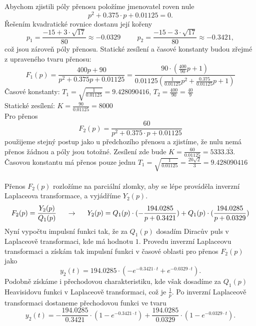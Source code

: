 \documentclass{article}
\begin{document}
			Abychom zjistili póly přenosu položíme jmenovatel roven nule
			\[p^2 + 0.375\cdot p + 0.01125=0.\]
			Řešením kvadratické rovnice dostanu její kořeny
			\[p_{1}=\frac{-15+3\cdot\sqrt{17}}{80}\approx -0.0329 \hspace{1cm} p_{2}=\frac{-15-3\cdot\sqrt{17}}{80}\approx -0.3421,\] což jsou zároveň póly přenosu.
			Statické zesílení a časové konstanty budou zřejmé z upraveného tvaru přenosu:
			\[F_{1}(p)=\frac{400p+90}{p^{2}+0.375p+0.01125}=\frac{90\cdot(\frac{400}{90}p+1)}{0.01125(\frac{1}{0.01125}p^{2}+\frac{0.375}{0.01125}p+1)}\]
			Časové konstanty:  \(T_{1}=\sqrt{\frac{1}{0.01125}}=9.428090416\), \(T_{2}=\frac{400}{90}=\frac{40}{9}\)\\
			Statické zesílení: \(K=\frac{90}{0.01125}=8000\)\\
			Pro přenos \[F_{2}(p)=\frac{60}{p^2 + 0.375\cdot p + 0.01125}\] použijeme stejný postup jako u předchozího přenosu a zjistíme, že nulu nemá přenos žádnou a póly jsou totožné. Zesílení zde bude \(K=\frac{60}{0.01125}=5333.\overline{33}\). Časovou konstantu má přenos pouze jednu \(T_{1}=\sqrt{\frac{1}{0.01125}}=\frac{20\sqrt{2}}{3}=9.428090416\)\\\\
			Přenos \(F_{2}(p)\) rozložíme na parciální zlomky, aby se lépe prováděla inverzní Laplaceova transformace, a vyjádříme \(Y_{2}(p)\).
			\[F_{2}(p)=\frac{Y_{2}(p)}{Q_{1}(p)}\hspace{5mm} \rightarrow \hspace{5mm} Y_{2}(p)=Q_{1}(p)\cdot(-\frac{194.0285}{p+0.3421})+Q_{1}(p)\cdot(\frac{194.0285}{p+0.0329})\]
			Nyní vypočtu impulsní funkci tak, že za \(Q_{1}(p)\) dosadím Diracův puls v Laplaceově transformaci, kde má hodnotu \(1\). Provedu inverzní Laplaceovu transformaci a získám tak impulsní funkci v časové oblasti pro přenos \(F_{2}(p)\) jako
			\[y_{2}(t)=194.0285\cdot\left(-e^{-0.3421\cdot t}+e^{-0.0329\cdot t}\right).\]
			Podobně získáme i přechodovou charakteristiku, kde však dosadíme za \(Q_{1}(p)\) Heavisidovu funkci v Laplaceově transformaci, což je \(\frac{1}{p}\). Po inverzní Laplaceově transformaci dostaneme přechodovou funkci ve tvaru
			\[y_{2}(t)=-\frac{194.0285}{0.3421}\cdot(1-e^{-0.3421\cdot t})+\frac{194.0285}{0.0329}\cdot(1-e^{-0.0329\cdot t}).\]
			
\end{document}

